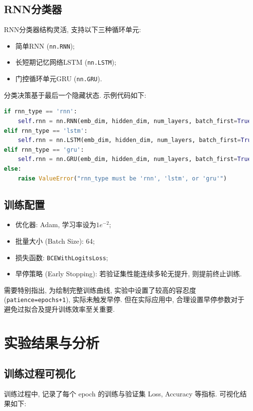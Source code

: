 \documentclass[11pt]{article}
\begin{document}
\subsection{RNN分类器}
RNN分类器结构灵活, 支持以下三种循环单元:
\begin{itemize}
	\item 简单RNN (\texttt{nn.RNN});
	\item 长短期记忆网络LSTM (\texttt{nn.LSTM});
	\item 门控循环单元GRU (\texttt{nn.GRU}).
\end{itemize}
分类决策基于最后一个隐藏状态. 示例代码如下:
\begin{lstlisting}[language=Python]
if rnn_type == 'rnn':
	self.rnn = nn.RNN(emb_dim, hidden_dim, num_layers, batch_first=True)
elif rnn_type == 'lstm':
	self.rnn = nn.LSTM(emb_dim, hidden_dim, num_layers, batch_first=True)
elif rnn_type == 'gru':
	self.rnn = nn.GRU(emb_dim, hidden_dim, num_layers, batch_first=True)
else:
	raise ValueError("rnn_type must be 'rnn', 'lstm', or 'gru'")
\end{lstlisting}

\subsection{训练配置}
\begin{itemize}
	\item 优化器: Adam, 学习率设为\(1e^{-2}\);
	\item 批量大小 (Batch Size): 64;
	\item 损失函数: \texttt{BCEWithLogitsLoss};
	\item 早停策略 (Early Stopping): 若验证集性能连续多轮无提升, 则提前终止训练.
\end{itemize}

需要特别指出, 为绘制完整训练曲线, 实验中设置了较高的容忍度 (\texttt{patience=epochs+1}), 实际未触发早停. 但在实际应用中, 合理设置早停参数对于避免过拟合及提升训练效率至关重要.

\newpage

\section{实验结果与分析}
\subsection{训练过程可视化}
训练过程中, 记录了每个 epoch 的训练与验证集 Loss, Accuracy 等指标. 可视化结果如下:
\end{document}
